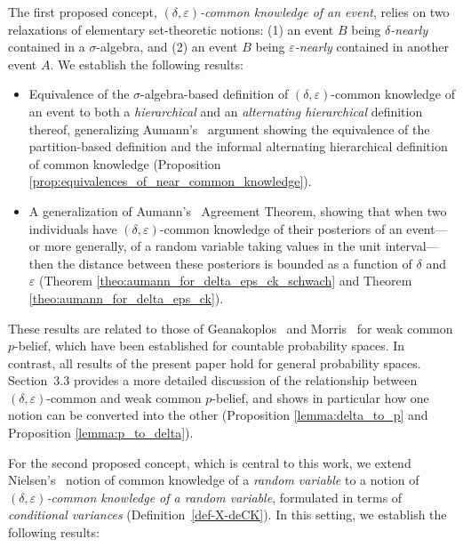 \documentclass[a4paper, 10pt]{article}
\numberwithin{theorem}{section}
\theoremstyle{definition}
\begin{document}
The first proposed concept, \emph{$(\delta, \varepsilon)$-common knowledge of an event}, relies on two relaxations of elementary set-theoretic notions: (1) an event $B$ being \emph{$\delta$-nearly} contained in a $\sigma$-algebra, and (2) an event $B$ being \emph{$\varepsilon$-nearly} contained in another event $A$. We establish the following results:

\begin{itemize}
	
	\item [(1)] Equivalence of the $\sigma$-algebra-based definition of $(\delta, \varepsilon)$-common knowledge of an event 
    to both a \emph{hierarchical} and an \emph{alternating hierarchical} definition thereof, generalizing Aumann's~\cite{Au76} argument showing the equivalence of the partition-based definition and the informal alternating hierarchical definition of common knowledge (Proposition \ref{prop:equivalences_of_near_common_knowledge}). 
	
	\item [(2)] A generalization of Aumann's~\cite{Au76} Agreement Theorem, showing that when two individuals have $(\delta, \varepsilon)$-common knowledge of their posteriors of an event---or more generally, of a random variable taking values in the unit interval---then the distance between these posteriors is bounded as a function of $\delta$ and  $\varepsilon$ (Theorem \ref{theo:aumann_for_delta_eps_ck_schwach} and Theorem \ref{theo:aumann_for_delta_eps_ck}).
\end{itemize}
These results are related to those of Geanakoplos~\cite{Ge94} and Morris~\cite{Mo99} for weak common $p$-belief, which have been established for countable probability spaces. In contrast, all results of the present paper hold for general probability spaces. Section~3.3 provides a more detailed discussion of the relationship between $(\delta, \varepsilon)$-common and weak common $p$-belief, and shows in particular how one notion can be converted into the other (Proposition \ref{lemma:delta_to_p} and Proposition \ref{lemma:p_to_delta}). 

For the second proposed concept, which is central to this work, we extend Nielsen's~\cite{Ni84} notion of common knowledge of a \emph{random variable} to a notion of \emph{$(\delta, \varepsilon)$-common knowledge of a random variable}, formulated in terms of \emph{conditional variances} (Definition~\ref{def-X-deCK}). In this setting, we establish the following results: 
\end{document}
